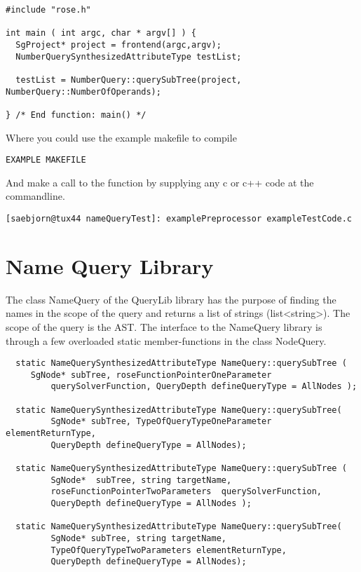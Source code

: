 {\begin{verbatim}
#include "rose.h"

int main ( int argc, char * argv[] ) {
  SgProject* project = frontend(argc,argv);
  NumberQuerySynthesizedAttributeType testList;
  
  testList = NumberQuery::querySubTree(project, NumberQuery::NumberOfOperands);

} /* End function: main() */
\end{verbatim}
Where you could use the example makefile to compile
\begin{verbatim}
EXAMPLE MAKEFILE
\end{verbatim}
And make a call to the function by supplying any c or c++ code at the commandline.
\begin{verbatim}
[saebjorn@tux44 nameQueryTest]: examplePreprocessor exampleTestCode.c
\end{verbatim}


 
\section{Name Query Library}

The class NameQuery of the QueryLib library has the purpose of
finding the names in the scope of the query and returns a list of
strings (list<string>). The scope of the query is
the AST. The interface to the NameQuery library is through a few
overloaded static member-functions in the class NodeQuery.

\begin{verbatim}
  static NameQuerySynthesizedAttributeType NameQuery::querySubTree (
	 SgNode* subTree, roseFunctionPointerOneParameter 
         querySolverFunction, QueryDepth defineQueryType = AllNodes );

  static NameQuerySynthesizedAttributeType NameQuery::querySubTree( 
         SgNode* subTree, TypeOfQueryTypeOneParameter elementReturnType,
         QueryDepth defineQueryType = AllNodes);
	 	
  static NameQuerySynthesizedAttributeType NameQuery::querySubTree (
         SgNode*  subTree, string targetName,
         roseFunctionPointerTwoParameters  querySolverFunction,
         QueryDepth defineQueryType = AllNodes );
	  
  static NameQuerySynthesizedAttributeType NameQuery::querySubTree( 
         SgNode* subTree, string targetName, 
         TypeOfQueryTypeTwoParameters elementReturnType,
         QueryDepth defineQueryType = AllNodes);	  
\end{verbatim}  


}
